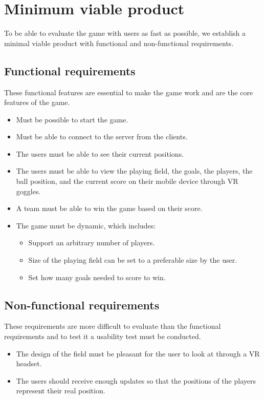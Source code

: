 \section{Minimum viable product}
To be able to evaluate the game with users as fast as possible, we establish a minimal viable product with functional and non-functional requirements.

\subsection{Functional requirements}
These functional features are essential to make the game work and are the core features of the game.

\begin{itemize}
    \item Must be possible to start the game.
    \item Must be able to connect to the server from the clients.
    \item The users must be able to see their current positions.
    \item The users must be able to view the playing field, the goals, the players, the ball position, and the current score on their mobile device through VR goggles.
    \item A team must be able to win the game based on their score.
    \item The game must be dynamic, which includes:
          \begin{itemize}
              \item Support an arbitrary number of players.
              \item Size of the playing field can be set to a preferable size by the user.
              \item Set how many goals needed to score to win.
          \end{itemize}
\end{itemize}

\subsection{Non-functional requirements}
These requirements are more difficult to evaluate than the functional requirements and to test it a usability test must be conducted.
\begin{itemize}
    \item The design of the field must be pleasant for the user to look at through a VR headset.
    \item The users should receive enough updates so that the positions of the players represent their real position.
\end{itemize}
